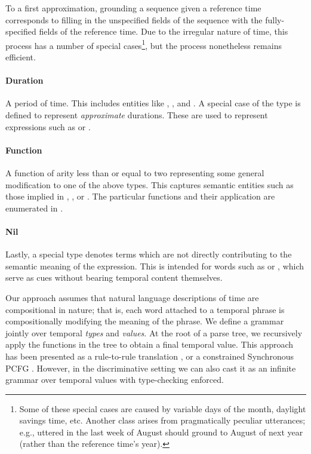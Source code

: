 To a first approximation, grounding a sequence given a reference time
  corresponds to filling in the unspecified fields of the sequence with the
  fully-specified fields of the reference time.
Due to the irregular nature of time, this process has a number of special
  cases\footnote{
    Some of these special cases are caused by variable days of the month,
      daylight savings time, etc.
    Another class arises from pragmatically peculiar utterances; e.g.,
       uttered in the last week of August
      should ground to August of next year (rather than the reference time's
      year).
  },
  but the process nonetheless remains efficient.
	
\paragraph{Duration}
A period of time.
This includes entities like , , and .
A special case of the  type is defined to represent 
	\textit{approximate} durations.
These are used to represent expressions such as  or
	.

\paragraph{Function}
A function of arity less than or equal to two representing some
	general modification to one of the above types.
This captures semantic entities such as those implied in
	, 
	, or .
The particular functions and their application are enumerated in 
	.

\paragraph{Nil}
Lastly, a special  type denotes terms which are not
	directly contributing to the semantic meaning of the expression.
This is intended for words such as  or , which serve as cues
	without bearing temporal content themselves.


Our approach assumes that natural language descriptions
	of time are compositional in nature; that is,
  each word attached to a temporal phrase is 
	compositionally modifying the meaning of the phrase.
We define a grammar jointly over temporal \textit{types} and
  \textit{values}.
At the root of a parse tree, we recursively apply the functions in the tree
	to obtain a final temporal value.
This approach has been presented as a rule-to-rule translation
	\cite[p.~263]{key:1976bach-semantics,key:1995allen-semantics},
	or a constrained Synchronous PCFG
	\cite{key:2001yamada-syntaxmt}.
However, in the discriminative setting we can also cast it as an infinite
  grammar over temporal values with type-checking enforced.


